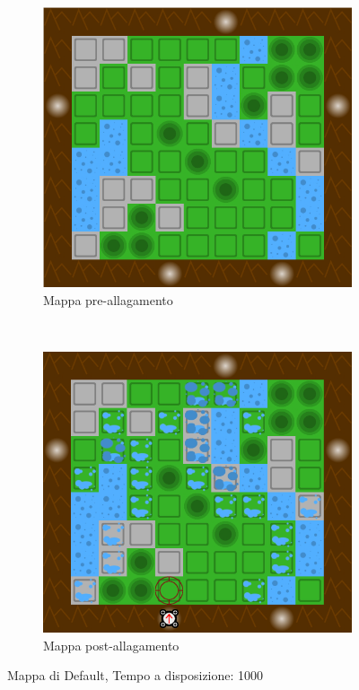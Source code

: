\begin{figure}
        \centering
        \begin{subfigure}[b]{0.5\textwidth}
                \includegraphics[width=\textwidth]{maps/default.png}
                \caption{Mappa pre-allagamento}
                \label{fig:default-pre}
        \end{subfigure}%
        ~ %
        \begin{subfigure}[b]{0.5\textwidth}
                \includegraphics[width=\textwidth]{maps/default-flood.png}
                \caption{Mappa post-allagamento}
                \label{fig:default-post}
        \end{subfigure}
       
        \caption{Mappa di Default, Tempo a disposizione: 1000}\label{fig:default-all}
\end{figure}
